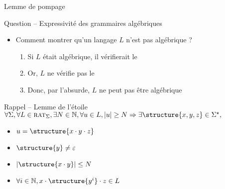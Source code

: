 
\begingroup

\begin{frame}{Lemme de pompage}

  \vspace{-5mm}
  \begin{block}{Question -- Expressivité des grammaires algébriques}
    \vspace{-2mm}
    \begin{itemize}
    \item Comment montrer qu'un langage $L$ n'est pas algébrique ? 
      \begin{enumerate}
      \item Si $L$ était algébrique, il vérifierait le  
      \item Or, $L$ ne vérifie pas le  
      \item Donc, par l'absurde, $L$ ne peut pas être algébrique
      \end{enumerate}
    \end{itemize}
  \end{block}

  
  \vspace{-1mm}
  \begin{block}{Rappel -- Lemme de l'étoile}
    \vspace{-1mm}
    $\forall\Sigma, \forall L\in \textsc{rat}_\Sigma, \exists N\in \mathbb{N}, \forall u\in L, |u| \ge N \Rightarrow \exists \structure{x, y, z}\in \Sigma^\star,$

    \vspace{1mm}
    \begin{minipage}{.4\textwidth}
      \begin{itemize}
      \item $u = \structure{x\cdot y \cdot z}$
      \item $\structure{y}\neq \varepsilon$
      \end{itemize}
    \end{minipage}%
    \begin{minipage}{.5\textwidth}
      \begin{itemize}
      \item $|\structure{x\cdot y}| \le N$
      \item $\forall i \in \mathbb{N}, x\cdot \structure{y^i} \cdot z \in L$
      \end{itemize}
    \end{minipage}
  \end{block}


\end{frame}
